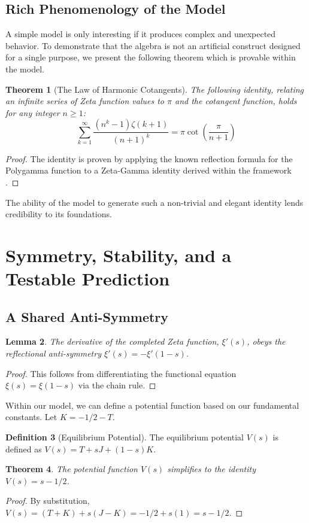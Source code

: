\documentclass{article}
\theoremstyle{plain}
\newtheorem{theorem}{Theorem}[section]
\newtheorem{lemma}[theorem]{Lemma}
\theoremstyle{definition}
\newtheorem{definition}[theorem]{Definition}
\theoremstyle{remark}
\begin{document}
\subsection{Rich Phenomenology of the Model}
A simple model is only interesting if it produces complex and unexpected behavior. To demonstrate that the algebra is not an artificial construct designed for a single purpose, we present the following theorem which is provable within the model.

\begin{theorem}[The Law of Harmonic Cotangents]
The following identity, relating an infinite series of Zeta function values to $\pi$ and the cotangent function, holds for any integer $n \ge 1$:
$$ \sum_{k=1}^{\infty} \frac{(n^k-1)\zeta(k+1)}{(n+1)^k} = \pi \cot\left(\frac{\pi}{n+1}\right)$$
\end{theorem}
\begin{proof}
The identity is proven by applying the known reflection formula for the Polygamma function to a Zeta-Gamma identity derived within the framework \cite{HarrCompendium}.
\end{proof}
The ability of the model to generate such a non-trivial and elegant identity lends credibility to its foundations.

\section{Symmetry, Stability, and a Testable Prediction}
\subsection{A Shared Anti-Symmetry}
\begin{lemma}
The derivative of the completed Zeta function, $\xi'(s)$, obeys the reflectional anti-symmetry $\xi'(s) = -\xi'(1-s)$.
\end{lemma}
\begin{proof}
This follows from differentiating the functional equation $\xi(s) = \xi(1-s)$ via the chain rule.
\end{proof}

Within our model, we can define a potential function based on our fundamental constants. Let $K = -1/2 - T$.
\begin{definition}[Equilibrium Potential]
The equilibrium potential $V(s)$ is defined as $V(s) = T + sJ + (1-s)K$.
\end{definition}

\begin{theorem}
The potential function $V(s)$ simplifies to the identity $V(s) = s - 1/2$.
\end{theorem}
\begin{proof}
By substitution, $V(s) = (T+K) + s(J-K) = -1/2 + s(1) = s - 1/2$.
\end{proof}
\end{document}
